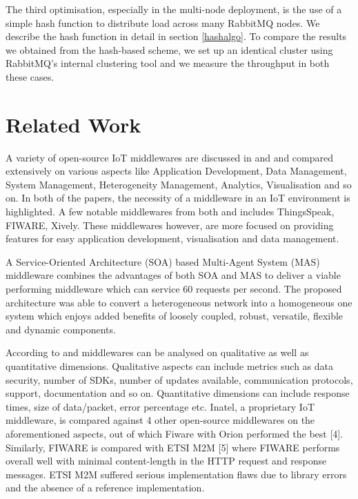 \documentclass[conference, 10pt]{IEEEtran}
\begin{document}
The third optimisation, especially in the multi-node deployment, is the use of a simple hash function to distribute load across many RabbitMQ nodes. We describe the hash function in detail in section \ref{hashalgo}. To compare the results we obtained from the hash-based scheme, we set up an identical cluster using RabbitMQ's internal clustering tool and we measure the throughput in both these cases.

\section{Related Work}
A variety of open-source IoT middlewares are discussed in \cite{ray2016survey} and \cite{farahzadi2018middleware} and compared extensively on various aspects like Application Development, Data Management, System Management, Heterogeneity Management, Analytics, Visualisation and so on. In both of the papers, the necessity of a middleware in an IoT environment is highlighted.  A few notable middlewares from both \cite{ray2016survey} and \cite{farahzadi2018middleware} includes ThingsSpeak, FIWARE, Xively. These middlewares however, are more focused on providing features for easy application development, visualisation and data management. 

A Service-Oriented Architecture (SOA) based Multi-Agent System (MAS) middleware \cite{zhiliang2011soa} combines the advantages of both SOA and MAS to deliver a viable performing middleware which can service 60 requests per second. The proposed architecture was able to convert a heterogeneous network into a homogeneous one system which enjoys added benefits of loosely coupled, robust, versatile, flexible and dynamic components.

According to \cite{da2018performance} and \cite{cardoso2017benchmarking} middlewares can be analysed on qualitative as well as quantitative dimensions. Qualitative aspects can include metrics such as data security, number of SDKs, number of updates available, communication protocols, support, documentation and so on. Quantitative dimensions can include response times, size of data/packet, error percentage etc. Inatel, a proprietary IoT middleware, is compared against 4 other open-source middlewares on the aforementioned aspects, out of which Fiware with Orion performed the best [4]. Similarly, FIWARE is compared with ETSI M2M [5] where FIWARE performs overall well with minimal content-length in the HTTP request and response messages. ETSI M2M suffered serious implementation flaws due to library errors and the absence of a reference implementation.
\end{document}
